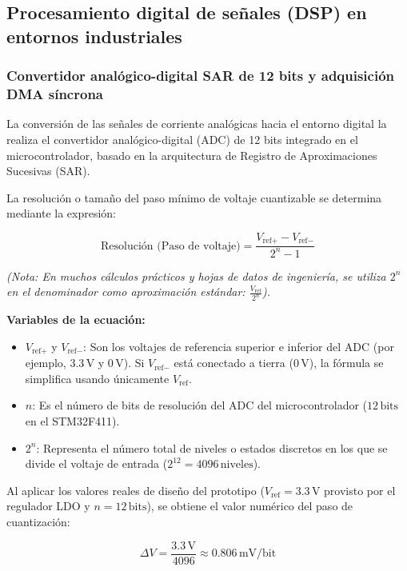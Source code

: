\subsection{Procesamiento digital de señales (DSP) en entornos industriales}
\subsubsection{Convertidor analógico-digital SAR de 12 bits y adquisición DMA síncrona}

La conversión de las señales de corriente analógicas hacia el entorno digital la realiza el convertidor analógico-digital (ADC) de 12 bits integrado en el microcontrolador, basado en la arquitectura de Registro de Aproximaciones Sucesivas (SAR).

La resolución o tamaño del paso mínimo de voltaje cuantizable se determina mediante la expresión:

\begin{equation}
\text{Resolución (Paso de voltaje)} = \frac{V_{\text{ref}+} - V_{\text{ref}-}}{2^n - 1}
\label{eq:resolucion_adc}
\end{equation}

\noindent\textit{(Nota: En muchos cálculos prácticos y hojas de datos de ingeniería, se utiliza $2^n$ en el denominador como aproximación estándar: $\frac{V_{\text{ref}}}{2^n}$).}

\vspace{2mm}
\noindent\textbf{Variables de la ecuación:}
\begin{itemize}
    \item $V_{\text{ref}+}$ y $V_{\text{ref}-}$: Son los voltajes de referencia superior e inferior del ADC (por ejemplo, $3.3\,\text{V}$ y $0\,\text{V}$). Si $V_{\text{ref}-}$ está conectado a tierra ($0\,\text{V}$), la fórmula se simplifica usando únicamente $V_{\text{ref}}$.
    \item $n$: Es el número de bits de resolución del ADC del microcontrolador ($12\,\text{bits}$ en el STM32F411).
    \item $2^n$: Representa el número total de niveles o estados discretos en los que se divide el voltaje de entrada ($2^{12} = 4096\,\text{niveles}$).
\end{itemize}

Al aplicar los valores reales de diseño del prototipo ($V_{\text{ref}} = 3.3\,\text{V}$ provisto por el regulador LDO y $n = 12\,\text{bits}$), se obtiene el valor numérico del paso de cuantización:

\begin{equation}
\Delta V = \frac{3.3\,\text{V}}{4096} \approx 0.806\,\text{mV/bit}
\label{eq:calculo_resolucion}
\end{equation}

